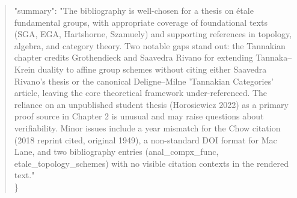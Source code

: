 \documentclass[11pt]{article}
\begin{document}
\begin{quote}
  "summary": "The bibliography is well-chosen for a thesis on étale fundamental groups, with appropriate coverage of foundational texts (SGA, EGA, Hartshorne, Szamuely) and supporting references in topology, algebra, and category theory. Two notable gaps stand out: the Tannakian chapter credits Grothendieck and Saavedra Rivano for extending Tannaka--Krein duality to affine group schemes without citing either Saavedra Rivano's thesis or the canonical Deligne--Milne 'Tannakian Categories' article, leaving the core theoretical framework under-referenced. The reliance on an unpublished student thesis (Horosiewicz 2022) as a primary proof source in Chapter 2 is unusual and may raise questions about verifiability. Minor issues include a year mismatch for the Chow citation (2018 reprint cited, original 1949), a non-standard DOI format for Mac Lane, and two bibliography entries (anal\_compx\_func, etale\_topology\_schemes) with no visible citation contexts in the rendered text."\\
\}\\
\end{quote}
\end{document}
